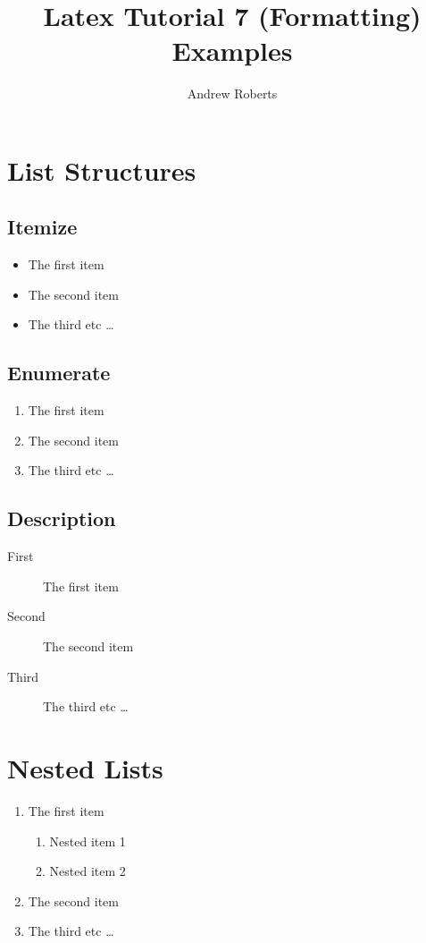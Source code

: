 \documentclass[english]{article}
\begin{document}
\title{Latex Tutorial 7 (Formatting) Examples}
\author{Andrew Roberts}
\maketitle

\section{List Structures}

\subsection{Itemize}

\begin{itemize}
  \item The first item
  \item The second item
  \item The third etc \ldots
\end{itemize}

\subsection{Enumerate}

\begin{enumerate}
  \item The first item
  \item The second item
  \item The third etc \ldots
\end{enumerate}

\subsection{Description}

\begin{description}
  \item[First] The first item
  \item[Second] The second item
  \item[Third] The third etc \ldots
\end{description}

\section{Nested Lists}
\begin{enumerate}
  \item The first item
  \begin{enumerate}
    \item Nested item 1
    \item Nested item 2
  \end{enumerate}
  \item The second item
  \item The third etc \ldots
\end{enumerate}
\end{document}
